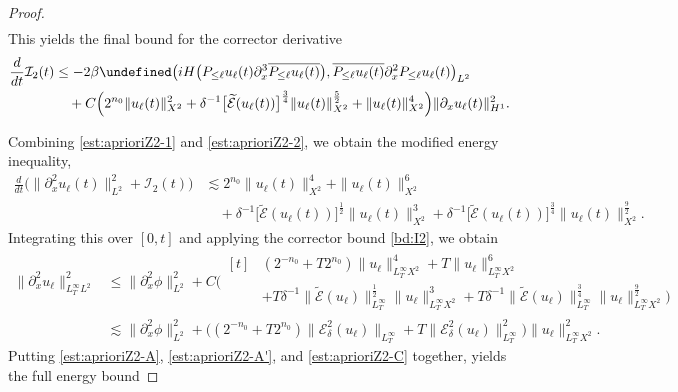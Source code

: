\documentclass{amsart}
\numberwithin{equation}{section}
\let\Re=\undefined\DeclareMathOperator{\Re}{Re}
\begin{document}
\begin{proof}
$$\begin{aligned}
\end{aligned}$$
This yields the final bound for the corrector derivative
\begin{equation}\label{est:aprioriZ2-2}
\begin{aligned}
\frac{d}{dt}\mathcal{I}_2(t)&\leq - 2\beta \Re \big( iH\big(P_{\leq \ell}u_\ell(t)\partial_x^3\overline{P_{\leq \ell}u_\ell(t)}\big) ,\overline{P_{\leq \ell}u_\ell(t)}\partial_x^2P_{\leq \ell}u_\ell(t)\big)_{L^2} \\
&\quad +C\Big( 2^{n_0}\| u_\ell(t) \|_{X^2}^2+ \delta^{-1}\big[ \widetilde{\mathcal{E}}(u_\ell(t))\big] ^{\frac34}\| u_\ell(t) \|_{X^2}^{\frac52}+\| u_\ell(t) \|_{X^2}^4\Big) \| \partial_xu_\ell(t) \|_{H^1}^2.
\end{aligned}
\end{equation}

Combining \eqref{est:aprioriZ2-1} and \eqref{est:aprioriZ2-2}, we obtain the modified energy inequality,
$$\begin{aligned}
\frac{d}{dt}\big( \| \partial_x^2u_\ell(t) \|_{L^2}^2+\mathcal{I}_2(t)\big) &\lesssim 2^{n_0}\| u_\ell(t) \|_{X^2}^4+\| u_\ell(t) \|_{X^2}^6 \\
&\quad +\delta^{-1}\big[ \widetilde{\mathcal{E}}(u_\ell(t))\big] ^{\frac12}\| u_\ell(t) \|_{X^2}^3+\delta^{-1}\big[ \widetilde{\mathcal{E}}(u_\ell(t))\big] ^{\frac34}\| u_\ell(t) \|_{X^2}^{\frac92}.
\end{aligned}$$
Integrating this over $[0, t]$ and applying the corrector bound \eqref{bd:I2}, we obtain
\begin{equation}\label{est:aprioriZ2-C}
\begin{aligned}
\| \partial_x^2u_\ell \|_{L^\infty_TL^2}^2
&\leq \| \partial_x^2\phi \|_{L^2}^2+C
\Big( \begin{aligned}[t]
&(2^{-n_0}+T2^{n_0})\| u_\ell \|_{L^\infty_TX^2}^4+T\| u_\ell \|_{L^\infty_TX^2}^6 \\
&+T\delta^{-1}\| \widetilde{\mathcal{E}}(u_\ell) \|_{L^\infty_T}^{\frac12}\| u_\ell \|_{L^\infty_TX^2}^3+T\delta^{-1}\| \widetilde{\mathcal{E}}(u_\ell) \|_{L^\infty_T}^{\frac34}\| u_\ell \|_{L^\infty_TX^2}^{\frac92}\Big)
\end{aligned} \\
&\lesssim \| \partial_x^2\phi \|_{L^2}^2+\Big( (2^{-n_0}+T2^{n_0})\| \mathcal{E}^2_\delta(u_\ell) \|_{L^\infty_T}+T\| \mathcal{E}^2_\delta(u_\ell) \|_{L^\infty_T}^2\Big) \| u_\ell \|_{L^\infty_TX^2}^2.
\end{aligned}
\end{equation}
Putting \eqref{est:aprioriZ2-A}, \eqref{est:aprioriZ2-A'}, and \eqref{est:aprioriZ2-C} together,  yields the full energy  bound

\end{proof}
\end{document}
